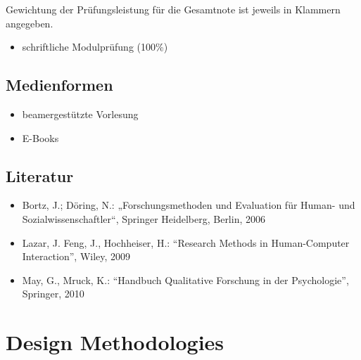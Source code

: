 Gewichtung der Prüfungsleistung für die Gesamtnote ist jeweils in
Klammern angegeben.

\begin{itemize}
\tightlist
\item
  schriftliche Modulprüfung (100\%)
\end{itemize}

\section*{Medienformen\label{/mi-2017/modulbeschreibungen-master/MA_All_Research_Methods}}\label{medienformenpathlabelmi-2017modulbeschreibungen-mastermaux5fallux5fresearchux5fmethods}

\begin{itemize}
\tightlist
\item
  beamergestützte Vorlesung
\item
  E-Books
\end{itemize}

\section*{Literatur\label{/mi-2017/modulbeschreibungen-master/MA_All_Research_Methods}}\label{literaturpathlabelmi-2017modulbeschreibungen-mastermaux5fallux5fresearchux5fmethods}

\begin{itemize}
\tightlist
\item
  Bortz, J.; Döring, N.: „Forschungsmethoden und Evaluation für Human-
  und Sozialwissenschaftler``, Springer Heidelberg, Berlin, 2006
\item
  Lazar, J. Feng, J., Hochheiser, H.: ``Research Methods in
  Human-Computer Interaction'', Wiley, 2009
\item
  May, G., Mruck, K.: ``Handbuch Qualitative Forschung in der
  Psychologie'', Springer, 2010
\end{itemize}

\chapter{Design
Methodologies\label{/mi-2017/modulbeschreibungen-master/MA_HCI_Design_Methodologies}}\label{design-methodologiespathlabelmi-2017modulbeschreibungen-mastermaux5fhciux5fdesignux5fmethodologies}

